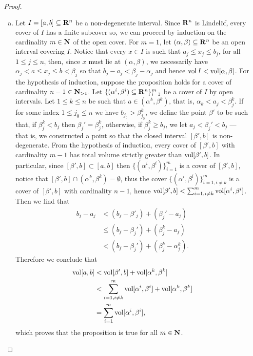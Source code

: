 \begin{proof}
\begin{enumerate}[(a)]
\item Let \(I = [a, b] \subseteq \mathbf{R}^n\) be a non-degenerate interval. Since
  \(\mathbf{R}^n\) is Lindel\"{o}f, every cover of \(I\) has a finite subcover so, we can
  proceed by induction on the cardinality \(m \in \mathbf{N}\) of the open cover. For
  \(m = 1\), let \((\alpha, \beta) \subseteq \mathbf{R}^n\) be an open interval covering
  \(I\). Notice that every \(x \in I\) is such that \(a_j \leq x_j \leq b_j\),
  for all \(1 \leq j \leq n\), then, since \(x\) must lie at \((\alpha,
  \beta)\), we necessarily have \(\alpha_j < a \leq x_j \leq b < \beta_j\) so
  that \(b_j - a_j < \beta_j - \alpha_j\) and hence \(\operatorname{vol} I < \operatorname{vol} [\alpha,
  \beta]\). For the hypothesis of induction, suppose the proposition holds for a
  cover of cardinality \(n - 1 \in \mathbf{N}_{> 1}\). Let \(\{(\alpha^{i},
  \beta^i) \subseteq \mathbf{R}^n\}_{i = 1}^m\) be a cover of \(I\) by open
  intervals. Let \(1 \leq k \leq n\) be such that \(a \in (\alpha^k, \beta^k)\),
  that is, \(\alpha_k < a_j < \beta_{j}^{k}\).  If for some index \(1 \leq j_0
  \leq n\) we have \(b_{j_0} > \beta_{j_0}^k\), we define the point \(\beta'\) to
  be such that, if \(\beta_j^k < b_j\) then \(\beta_j' = \beta_j^k\), otherwise,
  if \(\beta_j^k \geq b_j\), we let \(a_j < \beta_j' < b_j\) --- that is, we
  constructed a point so that the closed interval \([\beta', b]\) is
  non-degenerate. From the hypothesis of induction, every cover of \([\beta',
  b]\) with cardinality \(m - 1\) has total volume strictly greater than \(\operatorname{vol}
  [\beta', b]\). In particular, since \([\beta', b] \subset [a, b]\) then
  \(\{(\alpha^i, \beta^i)\}_{i=1}^m\) is a cover of \([\beta', b]\), notice that
  \([\beta', b] \cap (\alpha^k, \beta^k) = \emptyset\), thus the cover
  \(\{(\alpha^{i}, \beta^i)\}_{i = 1, i \neq k}^m\) is a cover of \([\beta', b]\)
  with cardinality \(n - 1\), hence \(\operatorname{vol} [\beta', b] < \sum_{i=1, i \neq k}^m
  \operatorname{vol} [\alpha^i, \beta^i]\). Then we find that
  \begin{align*}
    b_j - a_j
    &< (b_j - \beta'_j) + (\beta_j' - a_j) \\
    &\leq (b_j - \beta_j') + (\beta_j^k - a_j) \\
    &< (b_j - \beta_j') + (\beta_j^k - \alpha_j^k).
  \end{align*}
  Therefore we conclude that
  \begin{align*}
    \operatorname{vol} [a, b]
    &< \operatorname{vol} [\beta', b] + \operatorname{vol} [\alpha^k, \beta^k] \\
    &< \sum_{i=1, i \neq k}^{m} \operatorname{vol} [\alpha^i, \beta^{i}] + \operatorname{vol} [\alpha^k,
    \beta^k] \\
    &= \sum_{i=1}^m \operatorname{vol} [\alpha^i, \beta^i],
  \end{align*}
  which proves that the proposition is true for all \(m \in \mathbf{N}\).
\end{enumerate}
\end{proof}

